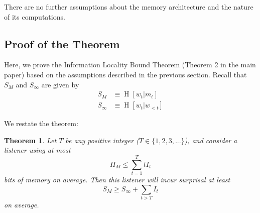 \documentclass[11pt,letterpaper]{article}
\newcounter{theorem}
\newtheorem{thm}[theorem]{Theorem}
\begin{document}
There are no further assumptions about the memory architecture and the nature of its computations.


\subsection{Proof of the Theorem}\label{sec:proof}

Here, we prove the Information Locality Bound Theorem (Theorem 2 in the main paper) based on the assumptions described in the previous section.
	Recall that $S_M$ and $S_\infty$ are given by
	\begin{align}\label{eq:sm-def}
		    S_M &\equiv \operatorname{H}[w_t|m_t] \\ %
		S_\infty &\equiv \operatorname{H}[w_t|w_{<t}] %
	\end{align}


	


We restate the theorem:

\begin{thm}\label{prop:suboptimal}
	Let $T$ be any positive integer ($T \in \{1, 2, 3, ...\}$), and consider a listener using at most
	\begin{equation}\label{eq:memory}
H_M \leq \sum_{t=1}^T t I_t
	\end{equation}
bits of memory on average.
Then this listener will incur surprisal at least
	\begin{equation}
	S_M \geq S_\infty + \sum_{t > T} I_t
	\end{equation}
	on average.
\end{thm}



\end{document}
